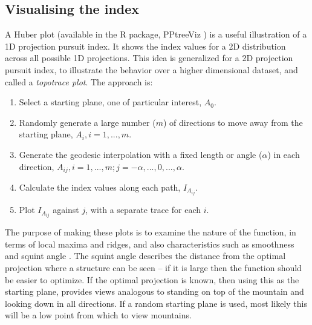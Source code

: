 \documentclass[]{interact}
\theoremstyle{plain}%
\theoremstyle{definition}
\theoremstyle{remark}
\def\tightlist{}
\begin{document}
\hypertarget{visualising-the-index}{%
\subsection{\texorpdfstring{Visualising the index
\label{sec:viz}}{Visualising the index }}\label{visualising-the-index}}

A Huber plot \citep{huberpp} (available in the R package, PPtreeViz
\citep{pptreeviz}) is a useful illustration of a 1D projection pursuit
index. It shows the index values for a 2D distribution across all
possible 1D projections. This idea is generalized for a 2D projection
pursuit index, to illustrate the behavior over a higher dimensional
dataset, and called a \emph{topotrace plot}. The approach is:

\begin{enumerate}
\def\labelenumi{\arabic{enumi}.}
\tightlist
\item
  Select a starting plane, one of particular interest, \(A_0\).
\item
  Randomly generate a large number (\(m\)) of directions to move away
  from the starting plane, \(A_i, i=1, ..., m\).
\item
  Generate the geodesic interpolation with a fixed length or angle
  (\(\alpha\)) in each direction,
  \(A_{ij}, i=1, ..., m; j=-\alpha, ..., 0, ..., \alpha\).
\item
  Calculate the index values along each path, \(I_{A_{ij}}\).
\item
  Plot \(I_{A_{ij}}\) against \(j\), with a separate trace for each
  \(i\).
\end{enumerate}

The purpose of making these plots is to examine the nature of the
function, in terms of local maxima and ridges, and also characteristics
such as smoothness and squint angle \citep{laa2020}. The squint angle
describes the distance from the optimal projection where a structure can
be seen -- if it is large then the function should be easier to
optimize. If the optimal projection is known, then using this as the
starting plane, provides views analogous to standing on top of the
mountain and looking down in all directions. If a random starting plane
is used, most likely this will be a low point from which to view
mountains.
\end{document}
